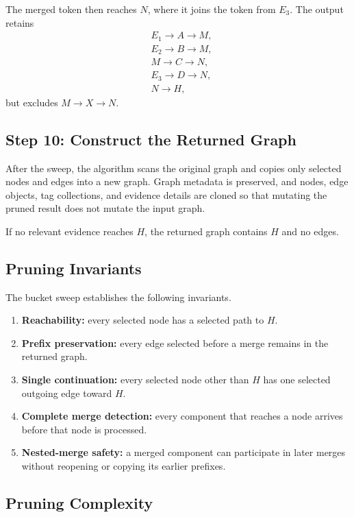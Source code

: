 \documentclass[11pt]{article}
\begin{document}
The merged token then reaches \(N\), where it joins the token from \(E_3\).
The output retains
\[
\begin{split}
    &E_1\to A\to M,\\
    &E_2\to B\to M,\\
    &M\to C\to N,\\
    &E_3\to D\to N,\\
    &N\to H,
\end{split}
\]
but excludes \(M\to X\to N\).

\subsection{Step 10: Construct the Returned Graph}

After the sweep, the algorithm scans the original graph and copies only
selected nodes and edges into a new graph.  Graph metadata is preserved, and
nodes, edge objects, tag collections, and evidence details are cloned so that
mutating the pruned result does not mutate the input graph.

If no relevant evidence reaches \(H\), the returned graph contains \(H\) and
no edges.

\subsection{Pruning Invariants}

The bucket sweep establishes the following invariants.

\begin{enumerate}
    \item \textbf{Reachability:} every selected node has a selected path to
          \(H\).
    \item \textbf{Prefix preservation:} every edge selected before a merge
          remains in the returned graph.
    \item \textbf{Single continuation:} every selected node other than \(H\)
          has one selected outgoing edge toward \(H\).
    \item \textbf{Complete merge detection:} every component that reaches a
          node arrives before that node is processed.
    \item \textbf{Nested-merge safety:} a merged component can participate in
          later merges without reopening or copying its earlier prefixes.
\end{enumerate}

\subsection{Pruning Complexity}
\end{document}
